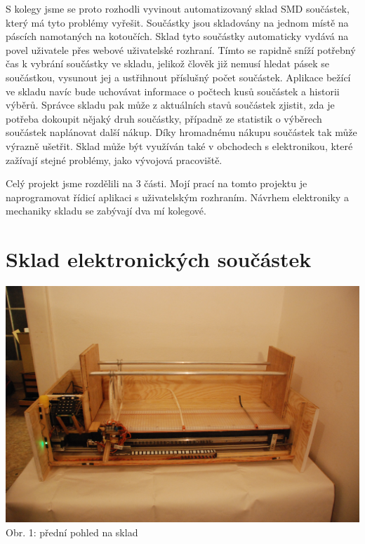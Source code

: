 \documentclass[12pt, a4paper, oneside]{article}
\begin{document}
S kolegy jsme se proto rozhodli vyvinout automatizovaný sklad SMD součástek, který má tyto problémy vyřešit.
Součástky jsou skladovány na jednom místě na páscích namotaných na kotoučích. Sklad tyto součástky automaticky vydává na povel uživatele přes webové uživatelské rozhraní. Tímto se rapidně sníží potřebný čas k vybrání součástky ve skladu, jelikož člověk již nemusí hledat pásek se součástkou, vysunout jej a ustřihnout příslušný počet součástek.
Aplikace bežící ve skladu navíc bude uchovávat informace o počtech kusů součástek a historii výběrů. Správce skladu pak může z aktuálních stavů součástek zjistit, zda je potřeba dokoupit nějaký druh součástky, případně ze statistik o výběrech součástek naplánovat další nákup. Díky hromadnému nákupu součástek tak může výrazně ušetřit.
Sklad může být využíván také v obchodech s elektronikou, které zažívají stejné problémy, jako vývojová pracoviště.

Celý projekt jsme rozdělili na 3 části. Mojí prací na tomto projektu je naprogramovat řídicí aplikaci s uživatelským rozhraním. Návrhem elektroniky a mechaniky skladu se zabývají dva mí kolegové.


\newpage

\section{Sklad elektronických součástek}


\begin{minipage}{\textwidth}
\begin{center}
\includegraphics[scale=0.40]{img/sklad.JPG}
\\
\caption{Obr. 1: přední pohled na sklad}
\end{center}
\end{minipage}
\vspace{4mm}
\end{document}
